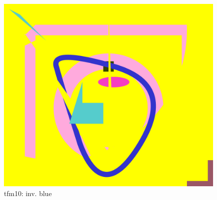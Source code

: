 \documentclass[12pt]{article}
\begin{document}
\begin{figure}[h]
\begin{minipage}[b]{0.3\textwidth}
	\end{minipage}
	\hfill
	\begin{minipage}[b]{0.3\textwidth}
		\includegraphics[width=\textwidth]{./pdf/main-test-out-10.pdf}
		\caption{tfm10: inv. blue}
	\end{minipage}
\end{figure}
\vfill
\end{document}
